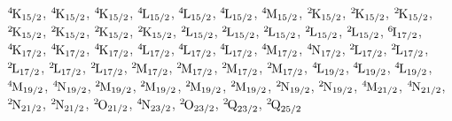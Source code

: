 \begin{mdframed}
\begin{center}
$\LSJterm{4}{K}{15/2}$, $\LSJterm{4}{K}{15/2}$, $\LSJterm{4}{K}{15/2}$, $\LSJterm{4}{L}{15/2}$, $\LSJterm{4}{L}{15/2}$, $\LSJterm{4}{L}{15/2}$, $\LSJterm{4}{M}{15/2}$, $\LSJterm{2}{K}{15/2}$, $\LSJterm{2}{K}{15/2}$, $\LSJterm{2}{K}{15/2}$, $\LSJterm{2}{K}{15/2}$, $\LSJterm{2}{K}{15/2}$, $\LSJterm{2}{K}{15/2}$, $\LSJterm{2}{K}{15/2}$, $\LSJterm{2}{L}{15/2}$, $\LSJterm{2}{L}{15/2}$, $\LSJterm{2}{L}{15/2}$, $\LSJterm{2}{L}{15/2}$, $\LSJterm{2}{L}{15/2}$, $\LSJterm{6}{I}{17/2}$, $\LSJterm{4}{K}{17/2}$, $\LSJterm{4}{K}{17/2}$, $\LSJterm{4}{K}{17/2}$, $\LSJterm{4}{L}{17/2}$, $\LSJterm{4}{L}{17/2}$, $\LSJterm{4}{L}{17/2}$, $\LSJterm{4}{M}{17/2}$, $\LSJterm{4}{N}{17/2}$, $\LSJterm{2}{L}{17/2}$, $\LSJterm{2}{L}{17/2}$, $\LSJterm{2}{L}{17/2}$, $\LSJterm{2}{L}{17/2}$, $\LSJterm{2}{L}{17/2}$, $\LSJterm{2}{M}{17/2}$, $\LSJterm{2}{M}{17/2}$, $\LSJterm{2}{M}{17/2}$, $\LSJterm{2}{M}{17/2}$, $\LSJterm{4}{L}{19/2}$, $\LSJterm{4}{L}{19/2}$, $\LSJterm{4}{L}{19/2}$, $\LSJterm{4}{M}{19/2}$, $\LSJterm{4}{N}{19/2}$, $\LSJterm{2}{M}{19/2}$, $\LSJterm{2}{M}{19/2}$, $\LSJterm{2}{M}{19/2}$, $\LSJterm{2}{M}{19/2}$, $\LSJterm{2}{N}{19/2}$, $\LSJterm{2}{N}{19/2}$, $\LSJterm{4}{M}{21/2}$, $\LSJterm{4}{N}{21/2}$, $\LSJterm{2}{N}{21/2}$, $\LSJterm{2}{N}{21/2}$, $\LSJterm{2}{O}{21/2}$, $\LSJterm{4}{N}{23/2}$, $\LSJterm{2}{O}{23/2}$, $\LSJterm{2}{Q}{23/2}$, $\LSJterm{2}{Q}{25/2}$
\end{center}
\end{mdframed}


